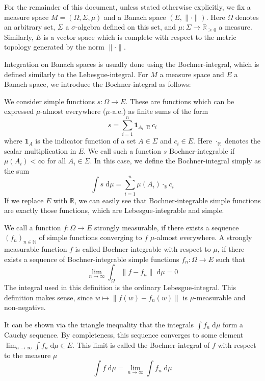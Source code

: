 \begin{remark}
	For the remainder of this document, unless stated otherwise explicitly, we fix a measure space $M = (\Omega, \Sigma, \mu)$ and a Banach space $(E, \lVert \cdot \rVert)$. Here $\Omega$ denotes an arbitrary set, $\Sigma$ a $\sigma$-algebra defined on this set, and $\mu : \Sigma \rightarrow \mathbb{R}_{\ge 0}$ a measure. Similarly, $E$ is a vector space which is complete with respect to the metric topology generated by the norm $\lVert \cdot \rVert$.
\end{remark}

Integration on Banach spaces is usually done using the Bochner-integral, which is defined similarly to the Lebesgue-integral. For $M$ a measure space and $E$ a Banach space, we introduce the Bochner-integral as follows:

\vspace{0.3cm}

We consider simple functions $s : \Omega \rightarrow E$. These are functions which can be expressed $\mu$-almost everywhere ($\mu$-a.e.) as finite sums of the form
\[
	s = \sum_{i=1}^n \mathbf{1}_{A_i} \cdot_\mathbb{R} c_i
\]
where $\mathbf{1}_A$ is the indicator function of a set $A \in \Sigma$ and $c_i \in E$. Here $\cdot_\mathbb{R}$ denotes the scalar multiplication in $E$. We call such a function $s$ Bochner-integrable if $\mu(A_i) < \infty$ for all $A_i \in \Sigma$. In this case, we define the Bochner-integral simply as the sum
\[
	\int s \; \textrm{d}\mu = \sum_{i=1}^n \mu(A_i) \cdot_\mathbb{R} c_i
\]
If we replace $E$ with $\mathbb{R}$, we can easily see that Bochner-integrable simple functions are exactly those functions, which are Lebesgue-integrable and simple.
\vspace{0.2cm}

We call a function $f : \Omega \rightarrow E$ strongly measurable, if there exists a sequence $(f_n)_{n\in\mathbb{N}}$ of simple functions converging to $f$ $\mu$-almost everywhere.
A strongly measurable function $f$ is called Bochner-integrable with respect to $\mu$, if there exists a sequence of Bochner-integrable simple functions $f_n : \Omega \rightarrow E$ such that
\[
	\lim_{n \to \infty} \int_\Omega \lVert f - f_n \rVert \; \textrm{d}\mu = 0
\]
The integral used in this definition is the ordinary Lebesgue-integral. This definition makes sense, since $w \mapsto \lVert f(w) - f_n(w) \rVert$ is $\mu$-measurable and non-negative.

It can be shown via the triangle inequality that the integrals $\int f_n\; \textrm{d}\mu$ form a Cauchy sequence. By completeness, this sequence converges to some element $\lim_{n \to \infty} \int f_n \; \textrm{d}\mu \in E$. This limit is called the Bochner-integral of $f$ with respect to the measure $\mu$
\[
	\int f \; \textrm{d}\mu = \lim_{n \to \infty} \int f_n \; \textrm{d}\mu
\]

